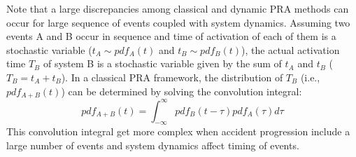 Note that a large discrepancies among classical and dynamic PRA methods can occur for large sequence of 
events coupled with system dynamics.
Assuming two events A and B occur in sequence and time of activation of each of them is a stochastic variable 
($t_A \sim pdf_A(t)$ and $t_B \sim pdf_B(t)$), the actual activation time $T_B$ of system B is a stochastic 
variable given by the sum of $t_A$ and $t_B$ ($T_B = t_A + t_B$). 
In a classical PRA framework, the distribution of $T_B$ (i.e., $pdf_{A+B}(t)$) can be 
determined by solving the convolution integral:   
\begin{equation}
  pdf_{A+B}(t) = \int_{-\infty}^{\infty} pdf_B(t-\tau) pdf_A(\tau) d\tau
  \label{eq:trajectory}
\end{equation}
This convolution integral get more complex when accident progression include a large number of events and 
system dynamics affect timing of events.




